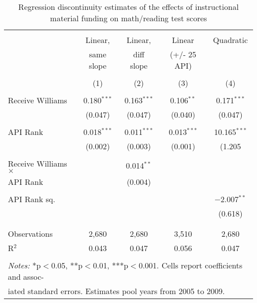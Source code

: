 
\begin{table}[!htbp] \centering 
  \caption{Regression discontinuity estimates of the effects of instructional material funding on math/reading test scores} 
  \label{tab:rd} 
\begin{tabular}{@{\extracolsep{5pt}}lcccc} 
\hline \hline \\[-1.8ex] 
 & Linear, 		& Linear, 		& Linear 		& Quadratic \\ 
 & same slope 	& diff slope 	& (+/- 25 API) 	&			 \\ 
\\[-1.8ex] & (1) & (2) & (3) & (4)\\ 
\hline \\[-1.8ex] 
 Receive Williams & 0.180$^{***}$ & 0.163$^{***}$ & 0.106$^{**}$ & 0.171$^{***}$ \\ 
  & (0.047) & (0.047) & (0.040) & (0.047) \\ 
  & & & & \\ 
 API Rank & 0.018$^{***}$ & 0.011$^{***}$ & 0.013$^{***}$ & 10.165$^{***}$ \\ 
  & (0.002) & (0.003) & (0.001) & (1.205 \\ 
  & & & & \\ 
 Receive Williams $\times$ &  & 0.014$^{**}$ &  &  \\ 
 API Rank &  & (0.004) &  &  \\ 
  & & & & \\ 
 API Rank sq. &  &  &  & $-$2.007$^{**}$ \\ 
  &  &  &  & (0.618) \\ 
  & & & & \\ 
\hline \\[-1.8ex] 
Observations & 2,680 & 2,680 & 3,510 & 2,680 \\ 
R$^{2}$ & 0.043 & 0.047 & 0.056 & 0.047 \\ 
\hline 
\hline \\[-1.8ex] 
\multicolumn{5}{l}{\textit{Notes:} *p$<$0.05, **p$<$0.01, ***p$<$0.001. Cells report coefficients and assoc-} \\
\multicolumn{5}{l}{iated standard errors. Estimates pool years from 2005 to 2009.} \\ 
\end{tabular} 
\end{table} 
